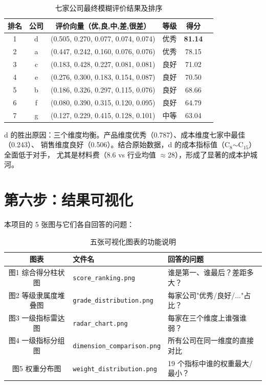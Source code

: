 \documentclass[a4paper,11pt]{ctexart}
\begin{document}
\begin{table}[H]
\centering
\caption{七家公司最终模糊评价结果及排序}
\begin{tabular}{cccccc}
\toprule
\textbf{排名} & \textbf{公司} & \textbf{评价向量（优,良,中,差,很差）} & \textbf{等级} & \textbf{得分} \\
\midrule
1 & d & (0.505, 0.270, 0.077, 0.074, 0.074) & 优秀 & \textbf{81.14} \\
2 & a & (0.447, 0.242, 0.160, 0.076, 0.076) & 优秀 & 78.15 \\
3 & c & (0.183, 0.428, 0.227, 0.081, 0.081) & 良好 & 71.02 \\
4 & e & (0.276, 0.300, 0.183, 0.154, 0.087) & 良好 & 70.50 \\
5 & b & (0.186, 0.326, 0.297, 0.115, 0.076) & 良好 & 68.66 \\
6 & f & (0.080, 0.390, 0.315, 0.120, 0.095) & 良好 & 64.79 \\
7 & g & (0.127, 0.229, 0.415, 0.128, 0.101) & 中等 & 63.04 \\
\bottomrule
\end{tabular}
\end{table}

\begin{keybox}
d 的胜出原因：三个维度均衡。产品维度优秀（0.787）、成本维度七家中最佳（0.243）、
销售维度良好（0.506）。结合原始数据，d 的成本指标值（C$_8$$\sim$C$_{15}$）全面低于对手，
尤其是材料费（8.6 vs 行业均值 $\approx$28），形成了显著的成本护城河。
\end{keybox}

\section{第六步：结果可视化}

本项目的 5 张图与它们各自回答的问题：

\begin{table}[H]
\centering
\caption{五张可视化图表的功能说明}
\begin{tabular}{cll}
\toprule
\textbf{图表} & \textbf{文件名} & \textbf{回答的问题} \\
\midrule
图1 综合得分柱状图 & \texttt{score\_ranking.png} & 谁是第一、谁最后？差距多大？ \\
图2 等级隶属度堆叠图 & \texttt{grade\_distribution.png} & 每家公司"优秀/良好/..."占比？ \\
图3 一级指标雷达图 & \texttt{radar\_chart.png} & 每家在三个维度上谁强谁弱？ \\
图4 一级指标分组图 & \texttt{dimension\_comparison.png} & 所有公司在同一维度的直接对比 \\
图5 权重分布图 & \texttt{weight\_distribution.png} & 19 个指标中谁的权重最大/最小？ \\
\bottomrule
\end{tabular}
\end{table}
\end{document}

